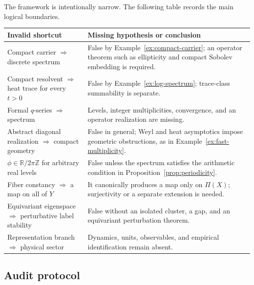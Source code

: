\documentclass[11pt,a4paper]{article}
\theoremstyle{definition}
\theoremstyle{remark}
\newcommand{\R}{\mathbb R}
\newcommand{\Z}{\mathbb Z}
\begin{document}
The framework is intentionally narrow. The following table records the main
logical boundaries.

\begin{center}
\small
\begin{tabularx}{\textwidth}{@{}>{\raggedright\arraybackslash}p{}
>{\raggedright\arraybackslash}X@{}}
\toprule
Invalid shortcut & Missing hypothesis or conclusion \\
\midrule
Compact carrier \(\Rightarrow\) discrete spectrum
& False by Example~\ref{ex:compact-carrier}; an operator theorem such as ellipticity
  and compact Sobolev embedding is required. \\
Compact resolvent \(\Rightarrow\) heat trace for every \(t>0\)
& False by Example~\ref{ex:log-spectrum}; trace-class summability is separate. \\
Formal \(q\)-series \(\Rightarrow\) spectrum
& Levels, integer multiplicities, convergence, and an operator realization are
  missing. \\
Abstract diagonal realization \(\Rightarrow\) compact geometry
& False in general; Weyl and heat asymptotics impose geometric obstructions,
  as in Example~\ref{ex:fast-multiplicity}. \\
\(\phi\in\R/2\pi\Z\) for arbitrary real levels
& False unless the spectrum satisfies the arithmetic condition in
  Proposition~\ref{prop:periodicity}. \\
Fiber constancy \(\Rightarrow\) a map on all of \(Y\)
& It canonically produces a map only on \(\Pi(X)\); surjectivity or a separate
  extension is needed. \\
Equivariant eigenspace \(\Rightarrow\) perturbative label stability
& False without an isolated cluster, a gap, and an equivariant perturbation
  theorem. \\
Representation branch \(\Rightarrow\) physical sector
& Dynamics, units, observables, and empirical identification remain absent. \\
\bottomrule
\end{tabularx}
\end{center}

\subsection{Audit protocol}
\end{document}

